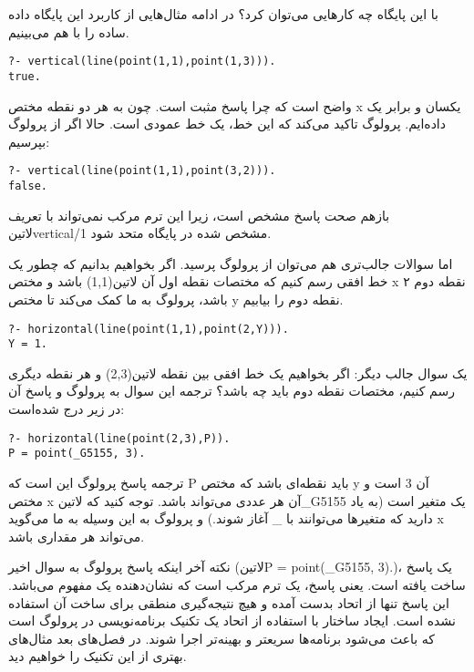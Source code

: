 با این پایگاه چه کارهایی می‌توان کرد؟ در ادامه مثال‌هایی از کاربرد این پایگاه داده ساده را با هم می‌بینیم.

\begin{latin}
\begin{lstlisting}
?- vertical(line(point(1,1),point(1,3))).
true.
\end{lstlisting}
\end{latin}

واضح است که چرا پاسخ مثبت است. چون به هر دو نقطه مختص x یکسان و برابر یک داده‌ایم. پرولوگ تاکید می‌کند که این خط، یک خط عمودی است. حالا اگر از پرولوگ بپرسیم:

\begin{latin}
\begin{lstlisting}
?- vertical(line(point(1,1),point(3,2))).
false.
\end{lstlisting}
\end{latin}

بازهم صحت پاسخ مشخص است، زیرا این ترم مرکب نمی‌تواند با تعریف ‌لاتین{vertical/1} مشخص شده در پایگاه متحد شود.

اما سوالات جالب‌تری هم می‌توان از پرولوگ پرسید. اگر بخواهیم بدانیم که چطور یک خط افقی رسم کنیم که مختصات نقطه اول آن ‌لاتین{(1,1)} باشد و مختص x نقطه دوم ۲ باشد، پرولوگ به ما کمک می‌کند تا مختص y نقطه دوم را بیابیم.

\begin{latin}
\begin{lstlisting}
?- horizontal(line(point(1,1),point(2,Y))).
Y = 1.
\end{lstlisting}
\end{latin}

یک سوال جالب دیگر: اگر بخواهیم یک خط افقی بین نقطه ‌لاتین{(2,3)} و هر نقطه دیگری رسم کنیم، مختصات نقطه دوم باید چه باشد؟ ترجمه این سوال به پرولوگ و پاسخ آن در زیر درج شده‌است:

\begin{latin}
\begin{lstlisting}
?- horizontal(line(point(2,3),P)).
P = point(_G5155, 3).
\end{lstlisting}
\end{latin}

ترجمه پاسخ پرولوگ این است که P باید نقطه‌ای باشد که مختص y آن 3 است و مختص x آن هر عددی می‌تواند باشد. توجه کنید که ‌لاتین{\_G5155} یک متغیر است (به یاد دارید که متغیرها می‌توانند با \_ آغاز شوند.) و پرولوگ به این وسیله به ما می‌گوید x می‌تواند هر مقداری باشد.

نکته آخر اینکه پاسخ پرولوگ به سوال اخیر (‌لاتین{P = point(\_G5155, 3).})، یک پاسخ ساخت یافته است. یعنی پاسخ، یک ترم مرکب است که نشان‌دهنده یک مفهوم می‌باشد. این پاسخ تنها از اتحاد بدست آمده و هیچ نتیجه‌گیری منطقی برای ساخت آن استفاده نشده است. ایجاد ساختار با استفاده از اتحاد یک تکنیک برنامه‌نویسی در پرولوگ است که باعث می‌شود برنامه‌ها سریعتر و بهینه‌تر اجرا شوند. در فصل‌های بعد مثال‌های بهتری از این تکنیک را خواهیم دید.


